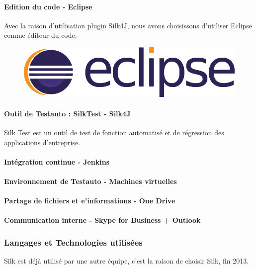 \documentclass[12pt]{article}
\begin{document}
        \paragraph{Edition du code - Eclipse}
        Avec la raison d'utilisation plugin Silk4J, nous avons choisissons d'utiliser Eclipse comme éditeur du code.
            \begin{figure}[H]
                \flushleft
                \includegraphics[width=.3\textwidth]{Eclipse_logo.png}
                \label{fig:eclipse_logo}
            \end{figure}
        \paragraph{Outil de Testauto : SilkTest - Silk4J}
        \par Silk Test est un outil de test de fonction automatisé et de régression des applications d'entreprise.
    
        \paragraph{Intégration continue - Jenkins}
        \paragraph{Environnement de Testauto - Machines virtuelles}
        \paragraph{Partage de fichiers et e'informations - One Drive }
        \paragraph{Communication interne - Skype for Business + Outlook}

\newpage

    \subsubsection{Langages et Technologies utilisées}
    \par Silk est déjà utilisé par une autre équipe, c'est la raison de choisir Silk, fin 2013.
    
\end{document}
